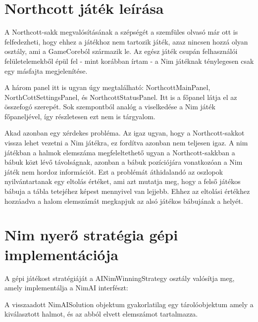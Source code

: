 \section{Northcott játék leírása}
A Northcott-sakk megvalósításának a szépségét a szemfüles olvasó már ott is felfedezheti, hogy ehhez a játékhoz nem tartozik játék, azaz nincsen hozzá olyan osztály, ami a GameCoreból származik le. Az egész játék csupán felhasználói felületelemekből épül fel - mint korábban írtam - a Nim játéknak ténylegesen csak egy másfajta megjelenítése.\ujsor

A három panel itt is ugyan úgy megtalálható: NorthcottMainPanel, NorthCottSettingsPanel, és NorthcottStatusPanel. Itt is a főpanel látja el az összefogó szerepét. Sok szempontból analóg a viselkedése a Nim játék főpaneljével, így részletesen ezt nem is tárgyalom.\ujsor

Akad azonban egy xérdekes probléma. Az igaz ugyan, hogy a Northcott-sakkot vissza lehet vezetni a Nim játékra, ez fordítva azonban nem teljesen igaz. A nim játékban a halmok elemszáma megfeleltethető ugyan a Northcott-sakkban a bábuk közt lévő távolságnak, azonban a bábuk pozíciójára vonatkozóan a Nim játék nem hordoz információt. Ezt a problémát áthidalandó az oszlopok nyilvántartanak egy eltolás értéket, ami azt mutatja meg, hogy a felső játékos bábuja a tábla tetejéhez képest mennyivel van lejjebb. Ehhez az eltolási értékhez hozzáadva a halom elemszámát megkapjuk az alsó játékos bábujának a helyét.

\section{Nim nyerő stratégia gépi implementációja} \label{section:nim_impl_winning_strategy}
A gépi játékost stratégiáját a AINimWinningStrategy osztály valósítja meg, amely implementálja a NimAI interfészt:


A visszaadott NimAISolution objektum gyakorlatilag egy tárolóobjektum amely a kiválasztott halmot, és az abból elvett elemszámot tartalmazza.

